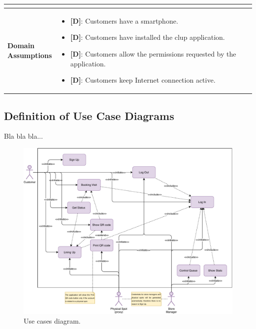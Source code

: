 \begin{table}[H]
\begin{tabular}{| m{} | m{} |}
\begin{itemize}
		\end{itemize} \\ 
	\hline
	\shortstack[l]{\textbf{Domain} \\ \textbf{Assumptions}} & 
		\begin{itemize}
			\item {\textbf{[D]}}: Customers have a smartphone.
			\item {\textbf{[D]}}: Customers have installed the \gls{clup} application.
			\item {\textbf{[D]}}: Customers allow the permissions requested by the application.
			\item {\textbf{[D]}}: Customers keep Internet connection active.
		\end{itemize} \\ 
	\hline
\end{tabular}
\end{table}


\subsection{Definition of Use Case Diagrams}

Bla bla bla...

\begin{figure}[H]
	\centering
	\includegraphics[width=1.0\textwidth]{images/use_cases_diagram.pdf}
	\caption{Use cases diagram.}
\end{figure}

